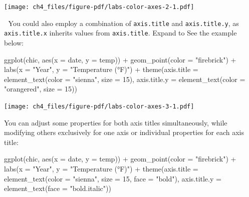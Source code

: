 \documentclass[
  letterpaper,
  DIV=11,
  numbers=noendperiod]{scrreprt}
\newenvironment{Shaded}{\begin{snugshade}}{\end{snugshade}}
\newcommand{\AttributeTok}[1]{\textcolor[rgb]{0.40,0.45,0.13}{#1}}
\newcommand{\DecValTok}[1]{\textcolor[rgb]{0.68,0.00,0.00}{#1}}
\newcommand{\FunctionTok}[1]{\textcolor[rgb]{0.28,0.35,0.67}{#1}}
\newcommand{\NormalTok}[1]{\textcolor[rgb]{0.00,0.23,0.31}{#1}}
\newcommand{\SpecialCharTok}[1]{\textcolor[rgb]{0.37,0.37,0.37}{#1}}
\newcommand{\StringTok}[1]{\textcolor[rgb]{0.13,0.47,0.30}{#1}}
\begin{document}
\texttt{[image: ch4\_files/figure-pdf/labs-color-axes-2-1.pdf]}

💁 You could also employ a combination of \texttt{axis.title} and
\texttt{axis.title.y}, as \texttt{axis.title.x} inherits values from
\texttt{axis.title}. Expand to See the example below:

\begin{Shaded}
\begin{Highlighting}[]
\FunctionTok{ggplot}\NormalTok{(chic, }\FunctionTok{aes}\NormalTok{(}\AttributeTok{x =}\NormalTok{ date, }\AttributeTok{y =}\NormalTok{ temp)) }\SpecialCharTok{+}
  \FunctionTok{geom\_point}\NormalTok{(}\AttributeTok{color =} \StringTok{"firebrick"}\NormalTok{) }\SpecialCharTok{+}
  \FunctionTok{labs}\NormalTok{(}\AttributeTok{x =} \StringTok{"Year"}\NormalTok{, }\AttributeTok{y =} \StringTok{"Temperature (°F)"}\NormalTok{) }\SpecialCharTok{+}
  \FunctionTok{theme}\NormalTok{(}\AttributeTok{axis.title =} \FunctionTok{element\_text}\NormalTok{(}\AttributeTok{color =} \StringTok{"sienna"}\NormalTok{, }\AttributeTok{size =} \DecValTok{15}\NormalTok{),}
        \AttributeTok{axis.title.y =} \FunctionTok{element\_text}\NormalTok{(}\AttributeTok{color =} \StringTok{"orangered"}\NormalTok{, }\AttributeTok{size =} \DecValTok{15}\NormalTok{))}
\end{Highlighting}
\end{Shaded}

\texttt{[image: ch4\_files/figure-pdf/labs-color-axes-3-1.pdf]}

You can adjust some properties for both axis titles simultaneously,
while modifying others exclusively for one axis or individual properties
for each axis title:

\begin{Shaded}
\begin{Highlighting}[]
\FunctionTok{ggplot}\NormalTok{(chic, }\FunctionTok{aes}\NormalTok{(}\AttributeTok{x =}\NormalTok{ date, }\AttributeTok{y =}\NormalTok{ temp)) }\SpecialCharTok{+}
  \FunctionTok{geom\_point}\NormalTok{(}\AttributeTok{color =} \StringTok{"firebrick"}\NormalTok{) }\SpecialCharTok{+}
  \FunctionTok{labs}\NormalTok{(}\AttributeTok{x =} \StringTok{"Year"}\NormalTok{, }\AttributeTok{y =} \StringTok{"Temperature (°F)"}\NormalTok{) }\SpecialCharTok{+}
  \FunctionTok{theme}\NormalTok{(}\AttributeTok{axis.title =} \FunctionTok{element\_text}\NormalTok{(}\AttributeTok{color =} \StringTok{"sienna"}\NormalTok{, }\AttributeTok{size =} \DecValTok{15}\NormalTok{, }\AttributeTok{face =} \StringTok{"bold"}\NormalTok{),}
        \AttributeTok{axis.title.y =} \FunctionTok{element\_text}\NormalTok{(}\AttributeTok{face =} \StringTok{"bold.italic"}\NormalTok{))}
\end{Highlighting}
\end{Shaded}
\end{document}
